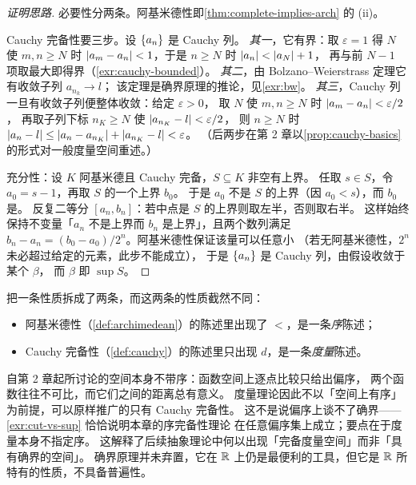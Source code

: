 \begin{proof}[证明思路]
  必要性分两条。阿基米德性即\cref{thm:complete-implies-arch} 的 (ii)。

  Cauchy 完备性要三步。设 \(\{a_{n}\}\) 是 Cauchy 列。
  \emph{其一}，它有界：取 \(\varepsilon=1\) 得 \(N\) 使 \(m,n \ge N\) 时
  \(\lvert a_{m}-a_{n}\rvert<1\)，于是 \(n \ge N\) 时 \(\lvert a_{n}\rvert < \lvert a_{N}\rvert+1\)，
  再与前 \(N-1\) 项取最大即得界（\cref{exr:cauchy-bounded}）。
  \emph{其二}，由 Bolzano--Weierstrass 定理它有收敛子列 \(a_{n_{k}} \to l\)；
  该定理是确界原理的推论，见\cref{exr:bw}。
  \emph{其三}，Cauchy 列一旦有收敛子列便整体收敛：给定 \(\varepsilon>0\)，
  取 \(N\) 使 \(m,n \ge N\) 时 \(\lvert a_{m}-a_{n}\rvert<\varepsilon/2\)，
  再取子列下标 \(n_{K} \ge N\) 使 \(\lvert a_{n_{K}}-l\rvert<\varepsilon/2\)，
  则 \(n \ge N\) 时 \(\lvert a_{n}-l\rvert \le \lvert a_{n}-a_{n_{K}}\rvert + \lvert a_{n_{K}}-l\rvert < \varepsilon\)。
  （后两步在第 2 章以\cref{prop:cauchy-basics} 的形式对一般度量空间重述。）

  充分性：设 \(K\) 阿基米德且 Cauchy 完备，\(S \subseteq K\) 非空有上界。
  任取 \(s \in S\)，令 \(a_{0} = s - 1\)，再取 \(S\) 的一个上界 \(b_{0}\)。
  于是 \(a_{0}\) 不是 \(S\) 的上界（因 \(a_{0} < s\)），而 \(b_{0}\) 是。
  反复二等分 \([a_{n}, b_{n}]\)：若中点是 \(S\) 的上界则取左半，否则取右半。
  这样始终保持不变量「\(a_{n}\) 不是上界而 \(b_{n}\) 是上界」，且两个数列满足
  \(b_{n} - a_{n} = (b_{0} - a_{0})/2^{n}\)。阿基米德性保证该量可以任意小
  （若无阿基米德性，\(2^{n}\) 未必超过给定的元素，此步不能成立），
  于是 \(\{a_{n}\}\) 是 Cauchy 列，由假设收敛于某个 \(\beta\)，
  而 \(\beta\) 即 \(\sup S\)。
\end{proof}

\begin{remark}[本章的核心]
   把一条性质拆成了两条，而这两条的性质截然不同：
  \begin{itemize}
    \item 阿基米德性（\cref{def:archimedean}）的陈述里出现了 \(<\)，是一条\emph{序}陈述；
    \item Cauchy 完备性（\cref{def:cauchy}）的陈述里只出现 \(d\)，是一条\emph{度量}陈述。
  \end{itemize}
  自第 2 章起所讨论的空间本身不带序：函数空间上逐点比较只给出偏序，
  两个函数往往不可比，而它们之间的距离总有意义。
  度量理论因此不以「空间上有序」为前提，可以原样推广的只有 Cauchy 完备性。
  这不是说偏序上谈不了确界——\cref{exr:cut-vs-sup} 恰恰说明本章的序完备性理论
  在任意偏序集上成立；要点在于度量本身不指定序。
  这解释了后续抽象理论中何以出现「完备度量空间」而非「具有确界的空间」。
  确界原理并未弃置，它在 \(\mathbb{R}\) 上仍是最便利的工具，但它是 \(\mathbb{R}\)
  所特有的性质，不具备普遍性。
\end{remark}

